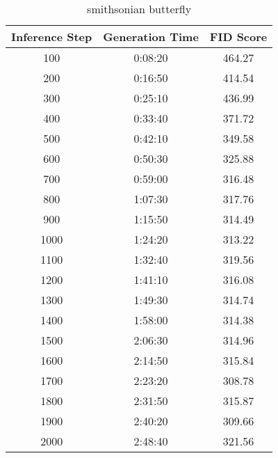 \begin{table}
    \centering
\begin{tabular}{ |c|c|c| } 
 \hline
 Inference Step & Generation Time & FID Score \\  
 \hline
 100 & 0:08:20 & 464.27 \\
\hline
200 & 0:16:50 & 414.54 \\
\hline
300 & 0:25:10 & 436.99 \\
\hline
400 & 0:33:40 & 371.72 \\
\hline
500 & 0:42:10 & 349.58 \\
\hline
600 & 0:50:30 & 325.88 \\
\hline
700 & 0:59:00 & 316.48 \\
\hline
800 & 1:07:30 & 317.76 \\
\hline
900 & 1:15:50 & 314.49 \\
\hline
1000 & 1:24:20 & 313.22 \\
\hline
1100 & 1:32:40 & 319.56 \\
\hline
1200 & 1:41:10 & 316.08 \\
\hline
1300 & 1:49:30 & 314.74 \\
\hline
1400 & 1:58:00 & 314.38 \\
\hline
1500 & 2:06:30 & 314.96 \\
\hline
1600 & 2:14:50 & 315.84 \\
\hline
1700 & 2:23:20 & 308.78 \\
\hline
1800 & 2:31:50 & 315.87 \\
\hline
1900 & 2:40:20 & 309.66 \\
\hline
2000 & 2:48:40 & 321.56 \\
\hline
\end{tabular}
    \caption{smithsonian butterfly}
    \label{table:smithsonian_butterfly}
\end{table}